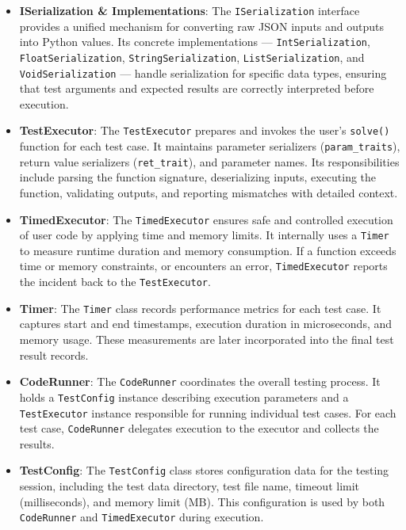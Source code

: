 \begin{itemize}
    \item \textbf{ISerialization \& Implementations}: 
    The \texttt{ISerialization} interface provides a unified mechanism for converting raw JSON inputs and outputs into Python values. Its concrete implementations — \texttt{IntSerialization}, \texttt{FloatSerialization}, \texttt{StringSerialization}, \texttt{ListSerialization}, and \texttt{VoidSerialization} — handle serialization for specific data types, ensuring that test arguments and expected results are correctly interpreted before execution.

    \item \textbf{TestExecutor}: 
    The \texttt{TestExecutor} prepares and invokes the user’s \texttt{solve()} function for each test case. It maintains parameter serializers (\texttt{param\_traits}), return value serializers (\texttt{ret\_trait}), and parameter names. Its responsibilities include parsing the function signature, deserializing inputs, executing the function, validating outputs, and reporting mismatches with detailed context.

    \item \textbf{TimedExecutor}: 
    The \texttt{TimedExecutor} ensures safe and controlled execution of user code by applying time and memory limits. It internally uses a \texttt{Timer} to measure runtime duration and memory consumption. If a function exceeds time or memory constraints, or encounters an error, \texttt{TimedExecutor} reports the incident back to the \texttt{TestExecutor}.

    \item \textbf{Timer}: 
    The \texttt{Timer} class records performance metrics for each test case. It captures start and end timestamps, execution duration in microseconds, and memory usage. These measurements are later incorporated into the final test result records.

    \item \textbf{CodeRunner}: 
    The \texttt{CodeRunner} coordinates the overall testing process. It holds a \texttt{TestConfig} instance describing execution parameters and a \texttt{TestExecutor} instance responsible for running individual test cases. For each test case, \texttt{CodeRunner} delegates execution to the executor and collects the results.

    \item \textbf{TestConfig}: 
    The \texttt{TestConfig} class stores configuration data for the testing session, including the test data directory, test file name, timeout limit (milliseconds), and memory limit (MB). This configuration is used by both \texttt{CodeRunner} and \texttt{TimedExecutor} during execution.


\end{itemize}
